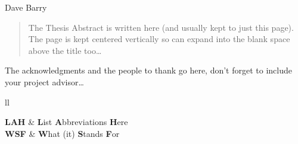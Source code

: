 \documentclass[
11pt, %
oneside, %
ukrainian,
english, %
singlespacing, %
headsepline, %
]{BachelorMasterThesis} %
\begin{document}
\hfill Dave Barry


\begin{abstract}
\addchaptertocentry{\abstractname} %
The Thesis Abstract is written here (and usually kept to just this page). The page is kept centered vertically so can expand into the blank space above the title too\ldots 
\end{abstract}


\begin{acknowledgements}
\addchaptertocentry{\acknowledgementname} %
The acknowledgments and the people to thank go here, don't forget to include your project advisor\ldots
\end{acknowledgements}


\tableofcontents %

\listoffigures %

\listoftables %


\begin{abbreviations}{ll} %

\textbf{LAH} & \textbf{L}ist \textbf{A}bbreviations \textbf{H}ere\\
\textbf{WSF} & \textbf{W}hat (it) \textbf{S}tands \textbf{F}or\\

\end{abbreviations}

\end{document}
